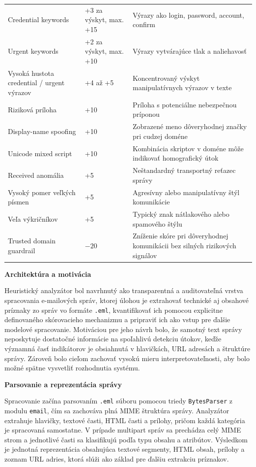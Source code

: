 \documentclass[conference]{IEEEtran}
\begin{document}
\begin{table}[!t]
\begin{tabular}{p{4.5cm} p{2.8cm} p{9cm}}
Credential keywords & +3 za výskyt, max. +15 & Výrazy ako login, password, account, confirm \\
Urgent keywords & +2 za výskyt, max. +10 & Výrazy vytvárajúce tlak a naliehavosť \\
Vysoká hustota credential / urgent výrazov & +4 až +5 & Koncentrovaný výskyt manipulatívnych výrazov v texte \\
Riziková príloha & +10 & Príloha s potenciálne nebezpečnou príponou \\
Display-name spoofing & +10 & Zobrazené meno dôveryhodnej značky pri cudzej doméne \\
Unicode mixed script & +10 & Kombinácia skriptov v doméne môže indikovať homografický útok \\
Received anomália & +5 & Neštandardný transportný reťazec správy \\
Vysoký pomer veľkých písmen & +5 & Agresívny alebo manipulatívny štýl komunikácie \\
Veľa výkričníkov & +5 & Typický znak nátlakového alebo spamového štýlu \\
Trusted domain guardrail & $-20$ & Zníženie skóre pri dôveryhodnej komunikácii bez silných rizikových signálov \\
\bottomrule
\end{tabular}
\end{table}
\textbf{Architektúra a motivácia}

Heuristický analyzátor bol navrhnutý ako transparentná a auditovateľná vrstva spracovania e-mailových správ, ktorej úlohou je extrahovať technické aj obsahové príznaky zo správ vo formáte \texttt{.eml}, kvantifikovať ich pomocou explicitne definovaného skórovacieho mechanizmu a pripraviť ich ako vstup pre ďalšie modelové spracovanie. Motiváciou pre jeho návrh bolo, že samotný text správy neposkytuje dostatočné informácie na spoľahlivú detekciu útokov, keďže významná časť indikátorov je obsiahnutá v hlavičkách, URL adresách a štruktúre správy. Zároveň bolo cieľom zachovať vysokú mieru interpretovateľnosti, aby bolo možné spätne vysvetliť rozhodnutia systému.

\textbf{Parsovanie a reprezentácia správy}

Spracovanie začína parsovaním \texttt{.eml} súboru pomocou triedy \texttt{BytesParser} z modulu \texttt{email}, čím sa zachováva plná MIME štruktúra správy. Analyzátor extrahuje hlavičky, textové časti, HTML časti a prílohy, pričom každá kategória je spracovaná samostatne. V prípade multipart správ sa prechádza celý MIME strom a jednotlivé časti sa klasifikujú podľa typu obsahu a atribútov. Výsledkom je jednotná reprezentácia obsahujúca textové segmenty, HTML obsah, prílohy a zoznam URL adries, ktorá slúži ako základ pre ďalšiu extrakciu príznakov.
\end{document}
